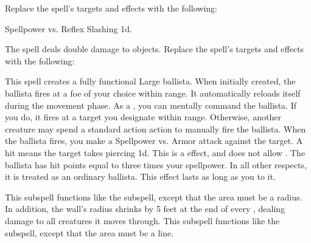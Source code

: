 Replace the spell's targets and effects with the following:
\begin{spellcontent}
\begin{augmenttargetinginfo}
\end{augmenttargetinginfo}
\begin{augmenteffects}
\begin{spellattack}{Spellpower vs. Reflex}
\spellsuccess Slashing  \minus1d.
\end{spellattack}
\end{augmenteffects}
\end{spellcontent}
The spell deals double damage to objects.
Replace the spell's targets and effects with the following:
\begin{spellcontent}
\begin{augmenttargetinginfo}
\end{augmenttargetinginfo}
\begin{augmenteffects}
\spelleffect
This spell creates a fully functional Large ballista.
When initially created, the ballista fires at a foe of your choice within \rnglong range.
It automatically reloads itself during the movement phase.
As a , you can mentally command the ballista.
If you do, it fires at a target you designate within \rnglong range.
Otherwise, another creature may spend a standard action action to manually fire the ballista.
When the ballista fires, you make a Spellpower vs. Armor attack against the target.
A hit means the target takes piercing  \minus1d.
This is a  effect, and does not allow .
The ballista has hit points equal to three times your spellpower.
In all other respects, it is treated as an ordinary ballista.
This effect lasts as long as you  to it.
\end{augmenteffects}
\end{spellcontent}
This subspell functions like the  subspell, except that the area must be a radius.
In addition, the wall's radius shrinks by 5 feet at the end of every , dealing damage to all creatures it moves through.
This subspell functions like the  subspell, except that the area must be a line.
